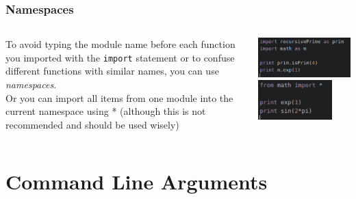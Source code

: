 \documentclass{beamer}
\begin{document}
\begin{frame}
\frametitle{Namespaces}
	\begin{columns}[T]
		\begin{column}[T]{5.5cm}
			To avoid typing the module name before each function you imported with the \texttt{import} statement or to confuse different functions with similar names, you can use \textit{namespaces}. \\ Or you can import all items from one module into the current namespace using * (although this is not recommended and should be used  wisely)
		\end{column}
		\begin{column}[T]{5cm}
			\includegraphics[width = 1\textwidth]{Namespaces.pdf} \\
			\includegraphics[width = 0.8\textwidth]{StarImport.pdf}
		\end{column}
		\end{columns}
\end{frame}

	\section{Command Line Arguments}
\end{document}
